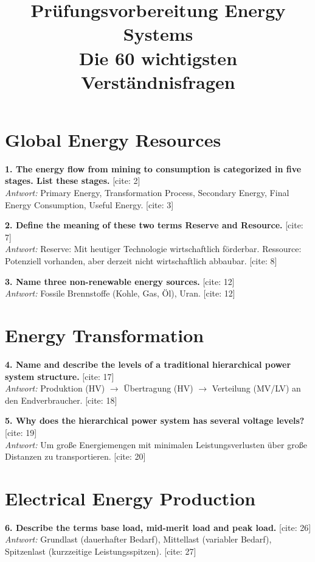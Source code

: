 \documentclass[11pt,a4paper]{article}
\title{\textbf{Prüfungsvorbereitung Energy Systems} \\ \Large Die 60 wichtigsten Verständnisfragen}
\author{}
\date{}
\begin{document}
\maketitle

\section*{Global Energy Resources}

\textbf{1. The energy flow from mining to consumption is categorized in five stages. List these stages.} [cite: 2]\\
\textit{Antwort:} Primary Energy, Transformation Process, Secondary Energy, Final Energy Consumption, Useful Energy. [cite: 3]

\vspace{0.5cm}
\textbf{2. Define the meaning of these two terms Reserve and Resource.} [cite: 7]\\
\textit{Antwort:} Reserve: Mit heutiger Technologie wirtschaftlich förderbar. Ressource: Potenziell vorhanden, aber derzeit nicht wirtschaftlich abbaubar. [cite: 8]

\vspace{0.5cm}
\textbf{3. Name three non-renewable energy sources.} [cite: 12]\\
\textit{Antwort:} Fossile Brennstoffe (Kohle, Gas, Öl), Uran. [cite: 12]

\section*{Energy Transformation}

\textbf{4. Name and describe the levels of a traditional hierarchical power system structure.} [cite: 17]\\
\textit{Antwort:} Produktion (HV) $\rightarrow$ Übertragung (HV) $\rightarrow$ Verteilung (MV/LV) an den Endverbraucher. [cite: 18]

\vspace{0.5cm}
\textbf{5. Why does the hierarchical power system has several voltage levels?} [cite: 19]\\
\textit{Antwort:} Um große Energiemengen mit minimalen Leistungsverlusten über große Distanzen zu transportieren. [cite: 20]

\section*{Electrical Energy Production}

\textbf{6. Describe the terms base load, mid-merit load and peak load.} [cite: 26]\\
\textit{Antwort:} Grundlast (dauerhafter Bedarf), Mittellast (variabler Bedarf), Spitzenlast (kurzzeitige Leistungsspitzen). [cite: 27]
\end{document}
